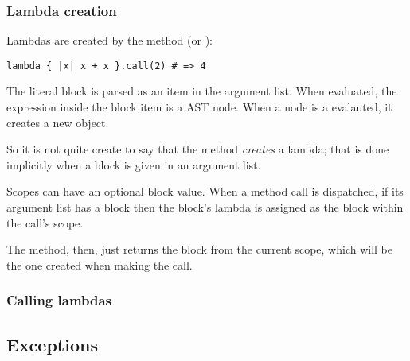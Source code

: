 \subsubsection{Lambda creation}

Lambdas are created by the  method (or ):

\begin{lstlisting}
lambda { |x| x + x }.call(2) # => 4
\end{lstlisting}

The literal block is parsed as an item in the argument list. When evaluated, the expression inside the block item is a  AST node. When a  node is a evalauted, it creates a new  object.

So it is not quite create to say that the  method \textit{creates} a lambda; that is done implicitly when a block is given in an argument list.

Scopes can have an optional block value. When a method call is dispatched, if its argument list has a block then the block's lambda is assigned as the block within the call's scope.

The  method, then, just returns the block from the current scope, which will be the one created when making the call.

\subsubsection{Calling lambdas}


\subsection{Exceptions}
